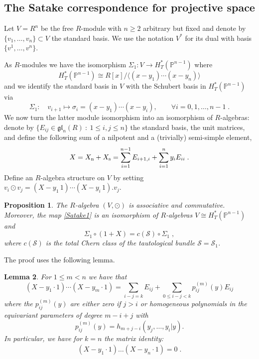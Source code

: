 \documentclass[12pt]{amsart}
\newcommand{\cS}{\mathcal{S}}
\newcommand{\mb}[1]{\mathbb{#1}}
\newcommand{\mc}[1]{\mathcal{#1}}
\newcommand{\ring}{R}
\newtheorem{prop}{Proposition}[section]
\newtheorem{lemma}[prop]{Lemma}
\numberwithin{equation}{section}
\numberwithin{figure}{section}
\newcommand{\gl}{\mathfrak{gl}}
\begin{document}
\subsection{The Satake correspondence for projective space}
Let $V=\ring^n$ be the free $\ring$-module with $n\ge 2$ arbitrary but fixed and denote by $\{v_1,\ldots,v_n\}\subset V$ the standard basis. We use the notation $V^*$ for its dual with basis $\{v^1,\ldots,v^n\}$.

As $\ring$-modules we have the isomorphism $\Sigma_1:V\to H^*_T(\mb{P}^{n-1})$ where 
\[
H^*_T(\mb{P}^{n-1})\cong\ring[x]/\langle (x-y_1)\cdots(x-y_n)\rangle
\]
and we identify the standard basis in $V$ with the Schubert basis in $H^*_T(\mb{P}^{n-1})$ via
\begin{equation}\label{Satake1}
\Sigma_1:\quad v_{i+1}\mapsto\sigma_{i}=(x-y_1)\cdots(x-y_i),\qquad \forall i=0,1,\ldots,n-1\;.
\end{equation}
We now turn the latter module isomorphism into an isomorphism of $\ring$-algebras: denote by $\{E_{ij}\in \gl_n(\ring)~:~1\le i,j\le n\}$ the standard basis, the unit matrices, and define the following sum of a nilpotent and a (trivially) semi-simple element,
\begin{equation}\label{X0}
X=X_{\rm n}+X_{\rm s}=\sum_{i=1}^{n-1}E_{i+1,i}+\sum_{i=1}^ny_iE_{ii}\;.
\end{equation}
Define an $\ring$-algebra structure on $V$ by setting $v_i\odot v_j=(X-y_1\,1)\cdots(X-y_i\,1).v_j$.
\begin{prop}
    The $\ring$-algebra $(V,\odot)$ is associative and commutative. Moreover, the map \eqref{Satake1} is an isomorphism of $\ring$-algebras $V\cong H^*_T(\mb{P}^{n-1})$ and 
    \[
    \Sigma_1\circ(1+X)=c(\mc{S})\circ\Sigma_1\;,
    \]
    where $c(\mc{S})$ is the total Chern class of the tautological bundle $\cS=\cS_1$.
\end{prop}
The proof uses the following lemma.
\begin{lemma}\label{lemX0}
    For $1\le m<n$ we have that
    \[
    (X-y_1\cdot 1)\cdots(X-y_m\cdot1)=\sum_{i-j=k}E_{ij}+\sum_{0\le i-j< k}p_{ij}^{(m)}(y)E_{ij}
    \]
    where the $p_{ij}^{(m)}(y)$ are either zero if $j>i$ or homogeneous polynomials in the equivariant parameters of degree $m-i+j$ with
    \[
        p_{ij}^{(m)}(y) = h_{m + j - i}(y_j, \ldots, y_i|y).
    \]
    In particular, we have for $k=n$ the matrix identity:
    \begin{gather}\label{BAE0}
        (X-y_1\cdot 1)\ldots(X-y_n\cdot 1)=0\;.
    \end{gather}
\end{lemma}
\end{document}
